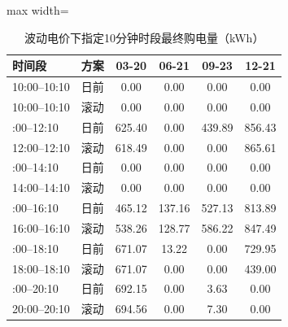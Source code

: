 \documentclass[UTF8,a4paper,zihao=-4,fontset=windows]{ctexart}
\begin{document}
\par
\begin{table}[H]\centering
\fontsize{9.5}{12}\selectfont\setlength{\tabcolsep}{4pt}\renewcommand{\arraystretch}{1.12}
\begin{adjustbox}{max width=\linewidth}\begin{tabular}{lccccc}\toprule
\textbf{时间段} & \textbf{方案} & \textbf{03-20} & \textbf{06-21} & \textbf{09-23} & \textbf{12-21}\\\midrule
10:00–10:10 & 日前 & 0.00 & 0.00 & 0.00 & 0.00\\
10:00–10:10 & 滚动 & 0.00 & 0.00 & 0.00 & 0.00\\
\addlinespace[2pt]
12:00–12:10 & 日前 & 625.40 & 0.00 & 439.89 & 856.43\\
12:00–12:10 & 滚动 & 618.49 & 0.00 & 0.00 & 865.61\\
\addlinespace[2pt]
14:00–14:10 & 日前 & 0.00 & 0.00 & 0.00 & 0.00\\
14:00–14:10 & 滚动 & 0.00 & 0.00 & 0.00 & 0.00\\
\addlinespace[2pt]
16:00–16:10 & 日前 & 465.12 & 137.16 & 527.13 & 813.89\\
16:00–16:10 & 滚动 & 538.26 & 128.77 & 586.22 & 847.49\\
\addlinespace[2pt]
18:00–18:10 & 日前 & 671.07 & 13.22 & 0.00 & 729.95\\
18:00–18:10 & 滚动 & 671.07 & 0.00 & 0.00 & 439.00\\
\addlinespace[2pt]
20:00–20:10 & 日前 & 692.15 & 0.00 & 3.63 & 0.00\\
20:00–20:10 & 滚动 & 694.56 & 0.00 & 7.30 & 0.00\\
\bottomrule\end{tabular}\end{adjustbox}
\caption{波动电价下指定10分钟时段最终购电量（kWh）}
\end{table}
\end{document}

